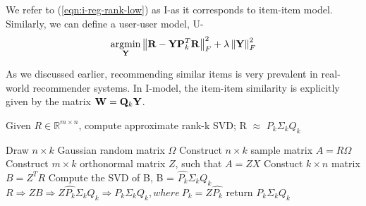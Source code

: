 We refer to (\ref{eqn:i-reg-rank-low}) as I-\LinearLow as it corresponds to item-item model. Similarly, we can define a user-user model, U-\LinearLow
\begin{align}
\label{eqn:u-reg-rank-low}
\underset{\mathbf{Y}}{\mathrm{argmin}}  \left \| \mathbf{R} - \mathbf{Y}\mathbf{P}_k^T\mathbf{R}\right \|_F^2 + \lambda \left \|  \mathbf{Y} \right \|_F^2 
\end{align}



As we discussed earlier, recommending similar items is very prevalent in real-world recommender systems.
In I-\LinearLow model, the item-item similarity is explicitly given by the matrix $\mathbf{W} = \mathbf{Q}_k \mathbf{Y} $. 


\begin{algorithm}
        \small
        \caption{Given $R \in \mathbb{R}^{m \times n}$, compute approximate rank-k SVD; R $\approx$ $P_k \Sigma_k Q_k$}
        \label{algo:RSVD}
        \begin{algorithmic}[1]

        \State Draw $n\times k$ Gaussian random matrix $\Omega$
        \State Construct $n\times k$ sample matrix $A = R\Omega$
        \State Construct $m\times k$ orthonormal matrix $Z$, such that $A  = ZX$
        \State Constuct $k\times n$ matrix $B = Z^TR$
        \State Compute the SVD of B, B =  $\hat{P_k} \Sigma_k Q_k$
        \State  $R \Rightarrow ZB \Rightarrow Z \hat{P_k} \Sigma_k Q_k \Rightarrow  P_k \Sigma_k Q_k, where\ P_k = Z \hat{P_k}$
        \State return $P_k \Sigma_k Q_k$
        \EndProcedure
        \end{algorithmic}
\end{algorithm}


